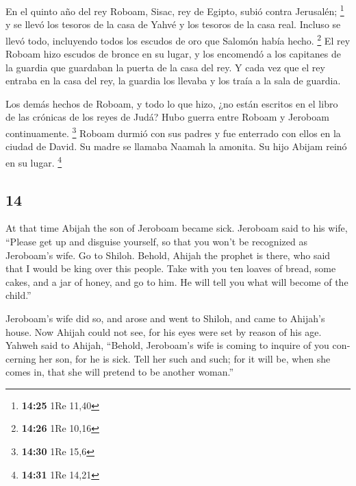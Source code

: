 \begin{paracol}{2}
 En el quinto año del rey Roboam, Sisac, rey de Egipto,
subió contra Jerusalén; \footnote{\textbf{14:25} 1Re 11,40}
 y se llevó los tesoros de la casa de Yahvé y los tesoros
de la casa real. Incluso se llevó todo, incluyendo todos los escudos de
oro que Salomón había hecho. \footnote{\textbf{14:26} 1Re 10,16}
 El rey Roboam hizo escudos de bronce en su lugar, y los
encomendó a los capitanes de la guardia que guardaban la puerta de la
casa del rey.  Y cada vez que el rey entraba en la casa
del rey, la guardia los llevaba y los traía a la sala de guardia.

 Los demás hechos de Roboam, y todo lo que hizo, ¿no
están escritos en el libro de las crónicas de los reyes de Judá?
 Hubo guerra entre Roboam y Jeroboam continuamente.
\footnote{\textbf{14:30} 1Re 15,6}  Roboam durmió con sus
padres y fue enterrado con ellos en la ciudad de David. Su madre se
llamaba Naamah la amonita. Su hijo Abijam reinó en su lugar. \footnote{\textbf{14:31}
  1Re 14,21}

\switchcolumn
\begin{otherlanguage}{english}

\hypertarget{section-27}{%
\section{14}\label{section-27}}

 At that time Abijah the son of Jeroboam became sick.
 Jeroboam said to his wife, ``Please get up and disguise
yourself, so that you won't be recognized as Jeroboam's wife. Go to
Shiloh. Behold, Ahijah the prophet is there, who said that I would be
king over this people.  Take with you ten loaves of bread,
some cakes, and a jar of honey, and go to him. He will tell you what
will become of the child.''

 Jeroboam's wife did so, and arose and went to Shiloh, and
came to Ahijah's house. Now Ahijah could not see, for his eyes were set
by reason of his age.  Yahweh said to Ahijah, ``Behold,
Jeroboam's wife is coming to inquire of you concerning her son, for he
is sick. Tell her such and such; for it will be, when she comes in, that
she will pretend to be another woman.''


\end{otherlanguage}
\end{paracol}
